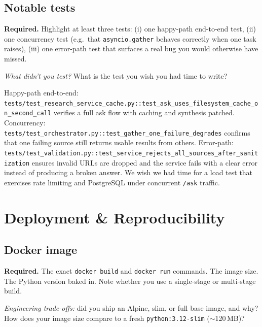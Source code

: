 \documentclass[11pt,a4paper]{article}
\begin{document}
\subsection{Notable tests}

\begin{deliverbox}
\textbf{Required.} Highlight at least three tests: (i) one happy-path end-to-end test, (ii) one concurrency test (e.g.\ that \texttt{asyncio.gather} behaves correctly when one task raises), (iii) one error-path test that surfaces a real bug you would otherwise have missed.
\end{deliverbox}

\begin{probebox}
\textit{What didn't you test?} What is the test you wish you had time to write?
\end{probebox}

Happy-path end-to-end: \texttt{tests/test\_research\_service\_cache.py::test\_ask\_uses\_filesystem\_cache\_on\_second\_call} verifies a full ask flow with caching and synthesis patched. Concurrency: \texttt{tests/test\_orchestrator.py::test\_gather\_one\_failure\_degrades} confirms that one failing source still returns usable results from others. Error-path: \texttt{tests/test\_validation.py::test\_service\_rejects\_all\_sources\_after\_sanitization} ensures invalid URLs are dropped and the service fails with a clear error instead of producing a broken answer. We wish we had time for a load test that exercises rate limiting and PostgreSQL under concurrent \texttt{/ask} traffic.

\section{Deployment \& Reproducibility}\label{sec:deploy}

\subsection{Docker image}

\begin{deliverbox}
\textbf{Required.} The exact \texttt{docker build} and \texttt{docker run} commands. The image size. The Python version baked in. Note whether you use a single-stage or multi-stage build.
\end{deliverbox}

\begin{probebox}
\textit{Engineering trade-offs:} did you ship an Alpine, slim, or full base image, and why? How does your image size compare to a fresh \texttt{python:3.12-slim} ($\sim$120\,MB)?
\end{probebox}
\end{document}
